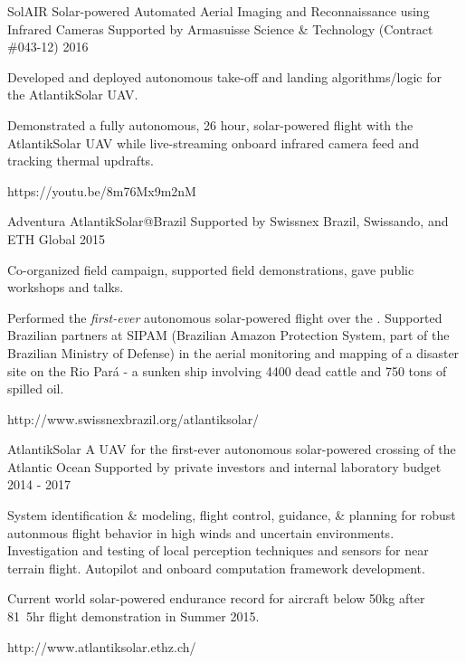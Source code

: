 \begin{cventries}
\cvprojwideentry
  	{SolAIR} %
  	{Solar-powered Automated Aerial Imaging and Reconnaissance using Infrared Cameras} %
    {Supported by Armasuisse Science \& Technology (Contract \#043-12)} %
    {2016} %
    {
      \begin{cvitems} %
        \item {Developed and deployed autonomous take-off and landing algorithms/logic for the AtlantikSolar UAV.}
        \item {Demonstrated a fully autonomous, 26 hour, solar-powered flight with the AtlantikSolar UAV while live-streaming onboard infrared camera feed and tracking thermal updrafts.}
      \end{cvitems}
    } %
    {https://youtu.be/8m76Mx9m2nM} %
    {\showprojectdescriptions}
    
\cvprojwideentry
  	{Adventura AtlantikSolar@Brazil} %
  	{} %
    {Supported by Swissnex Brazil, Swissando, and ETH Global} %
    {2015} %
    {
      \begin{cvitems} %
        \item {Co-organized field campaign, supported field demonstrations, gave public workshops and talks.}
        \item {Performed the \emph{first-ever} autonomous solar-powered flight over the . Supported Brazilian partners at SIPAM (Brazilian Amazon Protection System, part of the Brazilian Ministry of Defense) in the aerial monitoring and mapping of a disaster site on the Rio Pará - a sunken ship involving 4400 dead cattle and 750 tons of spilled oil.}
      \end{cvitems}
    } %
    {http://www.swissnexbrazil.org/atlantiksolar/} %
    {\showprojectdescriptions}

\cvprojwideentry
  	{AtlantikSolar} %
  	{A UAV for the first-ever autonomous solar-powered crossing of the Atlantic Ocean} %
    {Supported by private investors and internal laboratory budget} %
    {2014 - 2017} %
    {
      \begin{cvitems} %
        \item {System identification \& modeling, flight control, guidance, \& planning for robust autonmous flight behavior in high winds and uncertain environments. Investigation and testing of local perception techniques and sensors for near terrain flight. Autopilot and onboard computation framework development.}
        \item {Current world solar-powered endurance record for aircraft below \unit{50}{kg} after \unit{81.5}{hr} flight demonstration in Summer 2015.}
      \end{cvitems}
    } %
    {http://www.atlantiksolar.ethz.ch/} %
    {\showprojectdescriptions}


\end{cventries}
